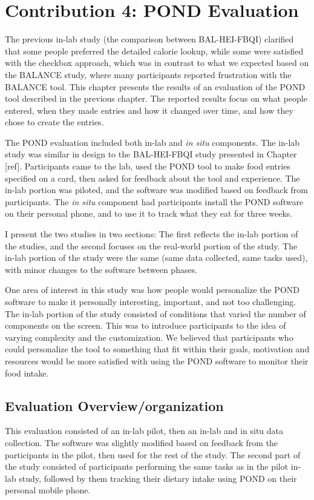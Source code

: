 
\chapter{Contribution 4: POND Evaluation}
\label{cha:cont4}
The previous in-lab study (the comparison between BAL-HEI-FBQI) clarified that some people preferred the detailed calorie lookup, while some were satisfied with the checkbox approach, which was in contrast to what we expected based on the BALANCE study, where many participants reported frustration with the BALANCE tool. This chapter presents the results of an evaluation of the POND tool described in the previous chapter. The reported results focus on what people entered, when they made entries and how it changed over time, and how they chose to create the entries.  

The POND evaluation included both in-lab and \textit{in situ} components.  The in-lab study was similar in design to the BAL-HEI-FBQI study presented in Chapter [ref]. Participants came to the lab, used the POND tool to make food entries specified on a card, then asked for feedback about the tool and experience. The in-lab portion was piloted, and the software was modified based on feedback from participants. The \textit{in situ} component had participants install the POND software on their  personal phone, and to use it to track what they eat for three weeks. 

I present the two studies in two sections: The first reflects the in-lab portion of the studies, and the second focuses on the real-world portion of the study. The in-lab portion of the study were the same (same data collected, same tasks used), with minor changes to the software between phases. 

One area of interest in this study was how people would personalize the POND software to make it personally interesting, important, and not too challenging. The in-lab portion of the study consisted of conditions that varied the number of components on the screen. This was to introduce participants to the idea of varying complexity and the customization. We believed that participants who could personalize the tool to something that fit within their goals, motivation and resources would be more satisfied with using the POND software to monitor their food intake. 

\section{Evaluation Overview/organization}
This evaluation consisted of an in-lab pilot, then an in-lab and in situ  data collection. The software was slightly modified based on feedback from the participants in the pilot, then used for the rest of the study. The second part of the study consisted of participants performing the same tasks as in the pilot in-lab study, followed by them tracking their dietary intake using POND on their personal mobile phone. 

